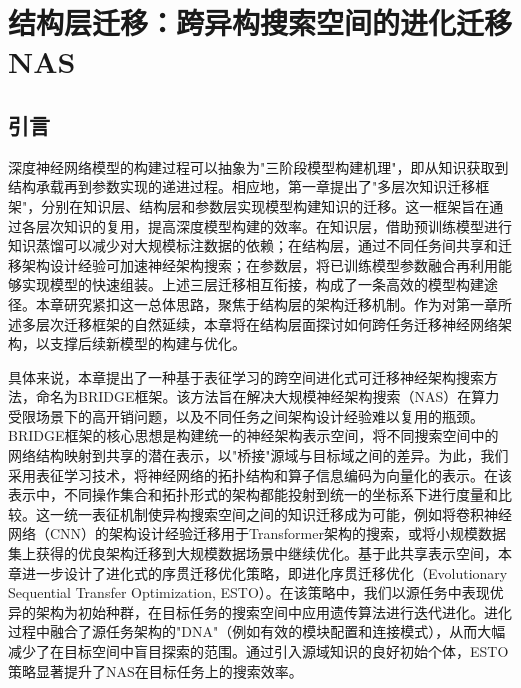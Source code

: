\documentclass[../main.tex]{subfiles}
\begin{document}
\chapter[\hspace{0pt}结构层迁移：跨异构搜索空间的进化迁移 NAS]{{\heiti{}\hspace{0pt}结构层迁移：跨异构搜索空间的进化迁移 NAS}}
\label{ch:chapter4}

\section[\hspace{-2pt}引言]{\heiti{}\hspace{-8pt}引言}
\label{sec:chapter4_introduction}

深度神经网络模型的构建过程可以抽象为"三阶段模型构建机理"，即从知识获取到结构承载再到参数实现的递进过程。相应地，第一章提出了"多层次知识迁移框架"，分别在知识层、结构层和参数层实现模型构建知识的迁移。这一框架旨在通过各层次知识的复用，提高深度模型构建的效率。在知识层，借助预训练模型进行知识蒸馏可以减少对大规模标注数据的依赖；在结构层，通过不同任务间共享和迁移架构设计经验可加速神经架构搜索；在参数层，将已训练模型参数融合再利用能够实现模型的快速组装。上述三层迁移相互衔接，构成了一条高效的模型构建途径。本章研究紧扣这一总体思路，聚焦于结构层的架构迁移机制。作为对第一章所述多层次迁移框架的自然延续，本章将在结构层面探讨如何跨任务迁移神经网络架构，以支撑后续新模型的构建与优化。

具体来说，本章提出了一种基于表征学习的跨空间进化式可迁移神经架构搜索方法，命名为BRIDGE框架。该方法旨在解决大规模神经架构搜索（NAS）在算力受限场景下的高开销问题，以及不同任务之间架构设计经验难以复用的瓶颈。BRIDGE框架的核心思想是构建统一的神经架构表示空间，将不同搜索空间中的网络结构映射到共享的潜在表示，以"桥接"源域与目标域之间的差异。为此，我们采用表征学习技术，将神经网络的拓扑结构和算子信息编码为向量化的表示。在该表示中，不同操作集合和拓扑形式的架构都能投射到统一的坐标系下进行度量和比较。这一统一表征机制使异构搜索空间之间的知识迁移成为可能，例如将卷积神经网络（CNN）的架构设计经验迁移用于Transformer架构的搜索，或将小规模数据集上获得的优良架构迁移到大规模数据场景中继续优化。基于此共享表示空间，本章进一步设计了进化式的序贯迁移优化策略，即进化序贯迁移优化（Evolutionary Sequential Transfer Optimization, ESTO）。在该策略中，我们以源任务中表现优异的架构为初始种群，在目标任务的搜索空间中应用遗传算法进行迭代进化。进化过程中融合了源任务架构的"DNA"（例如有效的模块配置和连接模式），从而大幅减少了在目标空间中盲目探索的范围。通过引入源域知识的良好初始个体，ESTO策略显著提升了NAS在目标任务上的搜索效率。
\end{document}
